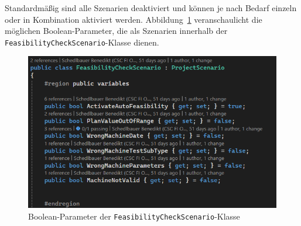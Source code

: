 Standardmäßig sind alle Szenarien deaktiviert und können je nach Bedarf einzeln oder in Kombination aktiviert werden. Abbildung~\ref{fig:unittests-parameters} veranschaulicht die möglichen Boolean-Parameter, die als Szenarien innerhalb der \texttt{FeasibilityCheckScenario}-Klasse dienen.

\begin{figure}[!htb]
    \centering
    \includegraphics[width=1\textwidth]{bilder/unittests-parameters.png}
    \caption{Boolean-Parameter der \texttt{FeasibilityCheckScenario}-Klasse}
    \label{fig:unittests-parameters}
\end{figure}

